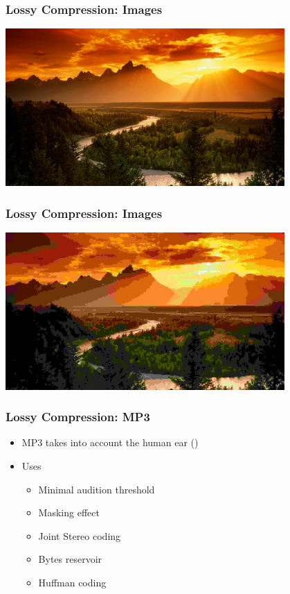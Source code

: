 \documentclass{../ucll-slides}
\begin{document}
\begin{frame}
  \frametitle{Lossy Compression: Images}
  \begin{center}
    \includegraphics[height=6cm]{lossless.jpg}
  \end{center}
\end{frame}

\begin{frame}
  \frametitle{Lossy Compression: Images}
  \begin{center}
    \includegraphics[height=6cm]{lossy.jpg}
  \end{center}
\end{frame}

\begin{frame}
  \frametitle{Lossy Compression: MP3}  
  \begin{itemize}
    \item MP3 takes into account the human ear ()
    \item Uses 
          \begin{itemize}
            \item Minimal audition threshold
            \item Masking effect
            \item Joint Stereo coding
            \item Bytes reservoir
            \item Huffman coding
          \end{itemize}
  \end{itemize}
\end{frame}
\end{document}
